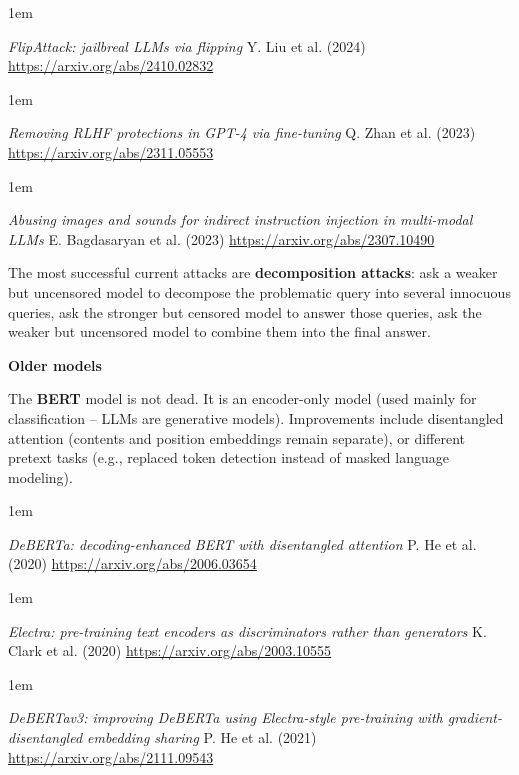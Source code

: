 \documentclass[a5paper]{article}
\let\d\textbf
\newenvironment{reference}{%
  \medskip\goodbreak
  \parskip 0pt
  \raggedright
  \leftskip 1em
  \obeylines
}{\par\medskip\goodbreak}
\def\subsection#1{{\par\bigskip\goodbreak\large\bfseries #1\par}}
\begin{document}
\begin{reference}
  \emph{FlipAttack: jailbreal LLMs via flipping}
  Y. Liu et al. (2024)
  \url{https://arxiv.org/abs/2410.02832}
\end{reference}

\begin{reference}
  \emph{Removing RLHF protections in GPT-4  via fine-tuning}
  Q. Zhan et al. (2023)
  \url{https://arxiv.org/abs/2311.05553}
\end{reference}

\begin{reference}
  \emph{Abusing images and sounds for indirect instruction injection in multi-modal LLMs}
  E. Bagdasaryan et al. (2023)
  \url{https://arxiv.org/abs/2307.10490}
\end{reference}

The most successful current attacks are \d{decomposition attacks}:
ask a weaker but uncensored model to decompose the problematic query into several innocuous queries,
ask the stronger but censored model to answer those queries,
ask the weaker but uncensored model to combine them into the final answer.

\subsection{Older models}

The \d{BERT} model is not dead.
It is an encoder-only model (used mainly for classification -- LLMs are generative models).
Improvements include disentangled attention (contents and position embeddings remain separate),
or different pretext tasks (e.g., replaced token detection instead of masked language modeling).

\begin{reference}
  \emph{DeBERTa: decoding-enhanced BERT  with disentangled attention}
  P. He et al. (2020)
  \url{https://arxiv.org/abs/2006.03654}
\end{reference}

\begin{reference}
  \emph{Electra: pre-training text encoders  as discriminators rather than generators}
  K. Clark et al. (2020)
  \url{https://arxiv.org/abs/2003.10555}
\end{reference}

\begin{reference}
  \emph{DeBERTav3: improving DeBERTa  using Electra-style pre-training  with gradient-disentangled embedding sharing}
  P. He et al. (2021)
  \url{https://arxiv.org/abs/2111.09543}
\end{reference}
\end{document}
